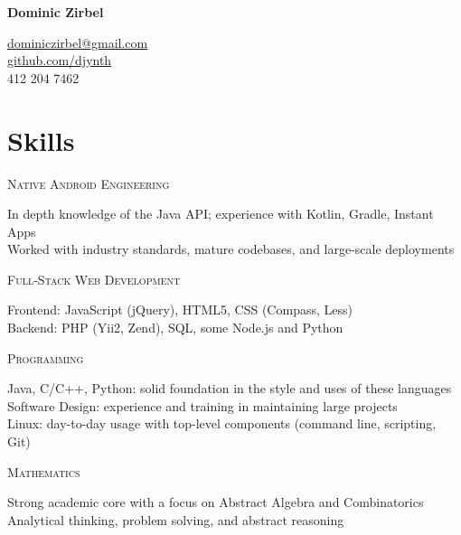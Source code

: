 \documentclass[letterpaper,10pt]{article}
\newenvironment{resumecols1}[1]
{
    \vspace{.08cm}
    \begin{minipage}[t]{.22\linewidth}
        \begin{flushright}
            \textsc{#1}
        \end{flushright}
    \end{minipage}
    \hspace{.005\linewidth}
    \begin{minipage}[t]{.7625\linewidth}
}
{
    \end{minipage}
    \vspace{.08cm}
}
\begin{document}
\thispagestyle{empty}

\begin{minipage}[t]{.5\linewidth}
    \vspace{0pt}
    \textbf{\Large{Dominic Zirbel}}
\end{minipage}
\begin{minipage}[t]{.5\linewidth}
    \vspace{0pt}
    \begin{flushright}
        \href{mailto:dominiczirbel@gmail.com}{dominiczirbel@gmail.com} \\
        \href{https://github.com/djynth}{github.com/djynth} \\
        412 204 7462
    \end{flushright}
\end{minipage}

\section{Skills}

\begin{resumecols1}{Native Android Engineering}
    In depth knowledge of the Java API; experience with Kotlin, Gradle, Instant Apps \\
    Worked with industry standards, mature codebases, and large-scale deployments
\end{resumecols1}

\begin{resumecols1}{Full-Stack Web Development}
    Frontend: JavaScript (jQuery), HTML5, CSS (Compass, Less) \\
    Backend: PHP (Yii2, Zend), SQL, some Node.js and Python
\end{resumecols1}

\begin{resumecols1}{Programming}
    Java, C/C++, Python: solid foundation in the style and uses of these languages \\
    Software Design: experience and training in maintaining large projects \\
    Linux: day-to-day usage with top-level components (command line, scripting, Git)
\end{resumecols1}

\begin{resumecols1}{Mathematics}
    Strong academic core with a focus on Abstract Algebra and Combinatorics \\
    Analytical thinking, problem solving, and abstract reasoning
\end{resumecols1}
\end{document}
